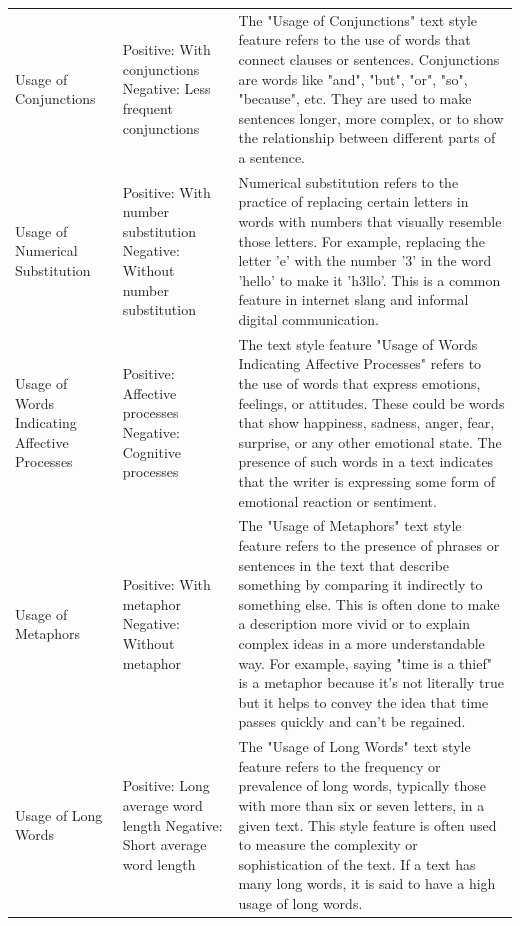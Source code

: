 {{\begin{longtable}{p{4cm} p{4cm} p{6.5cm}}
Usage of Conjunctions & Positive: With conjunctions \newline Negative: Less frequent conjunctions & The "Usage of Conjunctions" text style feature refers to the use of words that connect clauses or sentences. Conjunctions are words like "and", "but", "or", "so", "because", etc. They are used to make sentences longer, more complex, or to show the relationship between different parts of a sentence. \\
Usage of Numerical Substitution & Positive: With number substitution \newline Negative: Without number substitution & Numerical substitution refers to the practice of replacing certain letters in words with numbers that visually resemble those letters. For example, replacing the letter 'e' with the number '3' in the word 'hello' to make it 'h3llo'. This is a common feature in internet slang and informal digital communication. \\
Usage of Words Indicating Affective Processes & Positive: Affective processes \newline Negative: Cognitive processes & The text style feature "Usage of Words Indicating Affective Processes" refers to the use of words that express emotions, feelings, or attitudes. These could be words that show happiness, sadness, anger, fear, surprise, or any other emotional state. The presence of such words in a text indicates that the writer is expressing some form of emotional reaction or sentiment. \\
Usage of Metaphors & Positive: With metaphor \newline Negative: Without metaphor & The "Usage of Metaphors" text style feature refers to the presence of phrases or sentences in the text that describe something by comparing it indirectly to something else. This is often done to make a description more vivid or to explain complex ideas in a more understandable way. For example, saying "time is a thief" is a metaphor because it's not literally true but it helps to convey the idea that time passes quickly and can't be regained. \\
Usage of Long Words & Positive: Long average word length \newline Negative: Short average word length & The "Usage of Long Words" text style feature refers to the frequency or prevalence of long words, typically those with more than six or seven letters, in a given text. This style feature is often used to measure the complexity or sophistication of the text. If a text has many long words, it is said to have a high usage of long words. \\

\end{longtable}}}
